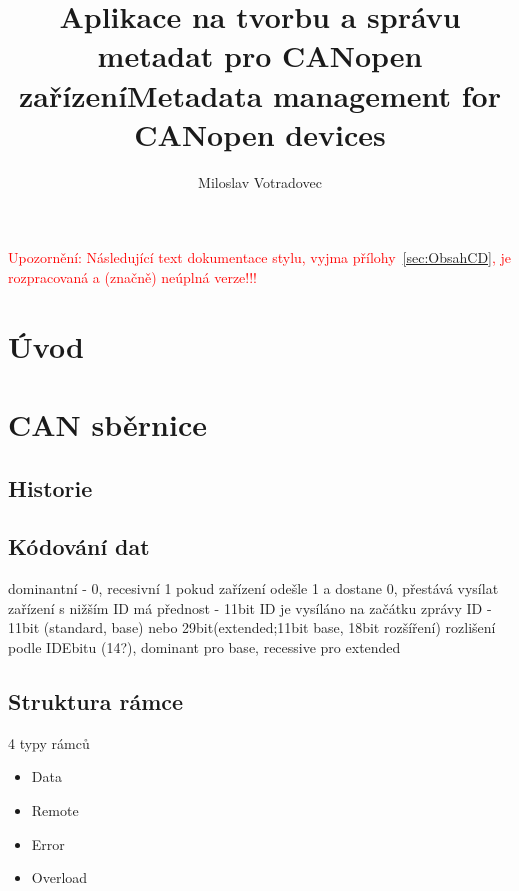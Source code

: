 \documentclass[
  field=ainfk,
  biblatex,
  glossaries,
  index
]{kidiplom}
\title{Aplikace na tvorbu a správu metadat pro CANopen zařízení}
\title[english]{Metadata management for CANopen devices}
\author{Miloslav Votradovec}
\begin{document}
\maketitle




\newcommand{\BibLaTeX}{\textsc{Bib}\LaTeX}

\noindent\textcolor{red}{\LARGE Upozornění: Následující text
  dokumentace stylu, vyjma přílohy~\ref{sec:ObsahCD}, je rozpracovaná
  a (značně) neúplná verze!!!}


\section{Úvod}
\section{CAN sběrnice}
\subsection{Historie}
\subsection{Kódování dat}
dominantní - 0, recesivní 1
pokud zařízení odešle 1 a dostane 0, přestává vysílat
zařízení s nižším ID má přednost - 11bit ID je vysíláno na začátku zprávy
ID - 11bit (standard, base) nebo 29bit(extended;11bit base, 18bit rozšíření)
rozlišení podle IDEbitu (14?), dominant pro base, recessive pro extended
\subsection{Struktura rámce}
4 typy rámců
\begin{itemize}
	\item Data
	\item Remote
	\item Error
	\item Overload
\end{itemize}
\end{document}
